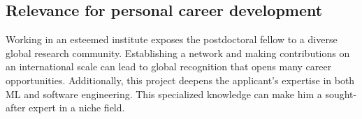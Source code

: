 \subsection{Relevance for personal career development }


Working in an esteemed institute exposes the postdoctoral fellow to a diverse global research community.
Establishing a network and making contributions on an international scale can lead to global recognition that opens many career opportunities.
%
Additionally, this project deepens the applicant's expertise in both ML and software engineering.
This specialized knowledge can make him a sought-after expert in a niche field.